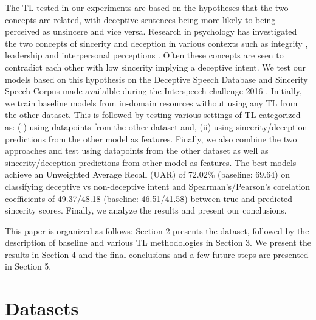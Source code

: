 \documentclass{article}
\begin{document}
The TL tested in our experiments are based on the hypotheses that the two concepts are related, with deceptive sentences being more likely to being perceived as unsincere and vice versa. 
Research in psychology has investigated the two concepts of sincerity and deception in various contexts such as integrity \cite{mcfall1987integrity}, leadership \cite{stinchfield1936sincerity} and interpersonal perceptions \cite{toris1984effects}. 
Often these concepts are seen to contradict each other with low sincerity implying a deceptive intent. 
We test our models based on this hypothesis on the Deceptive Speech Database and Sincerity Speech Corpus made availalble during the Interspeech challenge 2016 \cite{schuller2016interspeech}.
Initially, we train baseline models from in-domain resources without using any TL from the other dataset. 
This is followed by testing various settings of TL categorized as: (i) using datapoints from the other dataset and, (ii) using sincerity/deception predictions from the other model as features.
Finally, we also combine the two approaches and test using datapoints from the other dataset as well as sincerity/deception predictions from other model as features.
The best models achieve an Unweighted Average Recall (UAR) of 72.02\% (baseline: 69.64) on classifying deceptive vs non-deceptive intent and Spearman's/Pearson's corelation coefficients of 49.37/48.18 (baseline: 46.51/41.58) between true and predicted sincerity scores.
Finally, we analyze the results and present our conclusions. 

This paper is organized as follows: Section 2 presents the dataset, followed by the description of baseline and various TL methodologies in Section 3.
We present the results in Section 4 and the final conclusions and a few future steps are presented in Section 5.

\section{Datasets}
\end{document}
